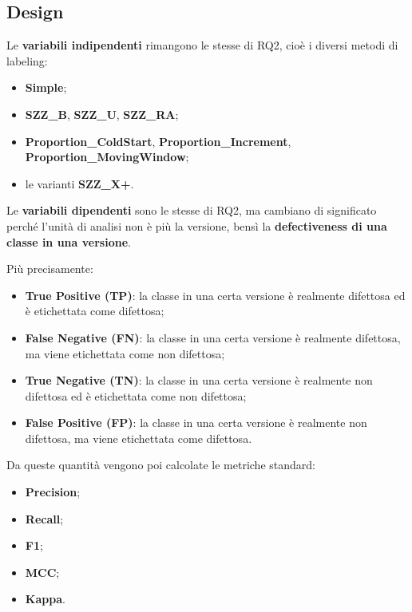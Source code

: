\subsection{Design}

Le \textbf{variabili indipendenti} rimangono le stesse di RQ2, cioè i diversi metodi di labeling:

\begin{itemize}
    \item \textbf{Simple};
    \item \textbf{SZZ\_B}, \textbf{SZZ\_U}, \textbf{SZZ\_RA};
    \item \textbf{Proportion\_ColdStart}, \textbf{Proportion\_Increment}, \textbf{Proportion\_MovingWindow};
    \item le varianti \textbf{SZZ\_X+}.
\end{itemize}

Le \textbf{variabili dipendenti} sono le stesse di RQ2, ma cambiano di significato perché l'unità di analisi non è più la versione, bensì la \textbf{defectiveness di una classe in una versione}.

Più precisamente:

\begin{itemize}
    \item \textbf{True Positive (TP)}: la classe in una certa versione è realmente difettosa ed è etichettata come difettosa;
    \item \textbf{False Negative (FN)}: la classe in una certa versione è realmente difettosa, ma viene etichettata come non difettosa;
    \item \textbf{True Negative (TN)}: la classe in una certa versione è realmente non difettosa ed è etichettata come non difettosa;
    \item \textbf{False Positive (FP)}: la classe in una certa versione è realmente non difettosa, ma viene etichettata come difettosa.
\end{itemize}

Da queste quantità vengono poi calcolate le metriche standard:

\begin{itemize}
    \item \textbf{Precision};
    \item \textbf{Recall};
    \item \textbf{F1};
    \item \textbf{MCC};
    \item \textbf{Kappa}.
\end{itemize}

